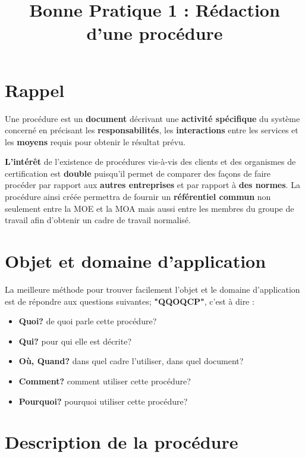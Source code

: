 \documentclass[a4paper]{article}
\begin{document}
\title{Bonne Pratique 1 : Rédaction d'une procédure}
\maketitle

\section{Rappel}

Une procédure est un \textbf{document} décrivant une \textbf{activité spécifique} du système concerné en précisant les \textbf{responsabilités}, les \textbf{interactions} entre les services et les \textbf{moyens} requis pour obtenir le résultat prévu.

\textbf{L'intérêt} de l'existence de procédures vis-à-vis des clients et des organismes de certification est \textbf{double} puisqu'il permet de comparer des façons de faire procéder par rapport aux \textbf{autres entreprises} et par rapport à \textbf{des normes}. La procédure ainsi créée permettra de fournir un \textbf{référentiel commun} non seulement entre la MOE et la MOA mais aussi entre les membres du groupe de travail afin d'obtenir un cadre de travail normalisé.

\section{Objet et domaine d'application}


La meilleure méthode pour trouver facilement l'objet et le domaine d'application est de répondre aux questions suivantes; \textbf{"QQOQCP"}, c'est à dire :

\begin{itemize}
\item \textbf{Quoi?} de quoi parle cette procédure?
\item \textbf{Qui?} pour qui elle est décrite?
\item \textbf{Où, Quand?} dans quel cadre l'utiliser, dans quel document?
\item \textbf{Comment?} comment utiliser cette procédure?
\item \textbf{Pourquoi?} pourquoi utiliser cette procédure?
\end{itemize}

\section{Description de la procédure}
\end{document}
